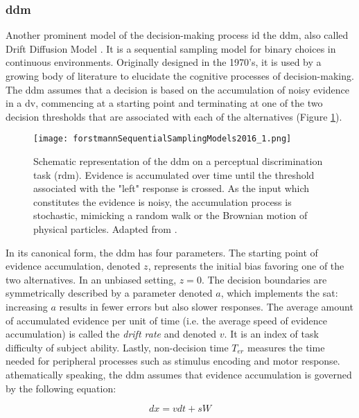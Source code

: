 \subsubsection{\acrlong{ddm}}

Another prominent model of the decision-making process id the \acrfull{ddm}, also called Drift Diffusion Model \cite{ratcliffDiffusionDecisionModel2008}. It is a sequential sampling model for binary choices in continuous environments. Originally designed in the 1970’s, it is used by a growing body of literature to elucidate the cognitive processes of decision-making. The \acrshort{ddm} assumes that a decision is based on the accumulation of noisy evidence in a \acrlong{dv}, commencing at a starting point and terminating at one of the two decision thresholds that are associated with each of the alternatives (Figure \ref{figure:ddm}).

\begin{figure}[ht]
    \centering
    \texttt{[image: forstmannSequentialSamplingModels2016\_1.png]}
    \caption[The \acrlong{ddm}]{Schematic representation of the \acrlong{ddm} on a perceptual discrimination task (\acrlong{rdm}). Evidence is accumulated over time until the threshold associated with the "left" response is crossed. As the input which constitutes the evidence is noisy, the accumulation process is stochastic, mimicking a random walk or the Brownian motion of physical particles. Adapted from \cite{forstmannSequentialSamplingModels2016}.}
    \label{figure:ddm}
\end{figure}

In its canonical form, the \acrshort{ddm} has four parameters. The starting point of evidence accumulation, denoted $z$, represents the initial bias favoring one of the two alternatives. In an unbiased setting, $z=0$. The decision boundaries are symmetrically described by a parameter denoted $a$, which implements the \acrlong{sat}: increasing $a$ results in fewer errors but also slower responses. The average amount of accumulated evidence per unit of time (i.e. the average speed of evidence accumulation) is called the \textit{drift rate} and denoted $v$. It is an index of task difficulty of subject ability. Lastly, non-decision time $T_{er}$ measures the time needed for peripheral processes such as stimulus encoding and motor response. athematically speaking, the \Acrshort{ddm} assumes that evidence accumulation is governed by the following equation:

$$dx = vdt + sW$$

